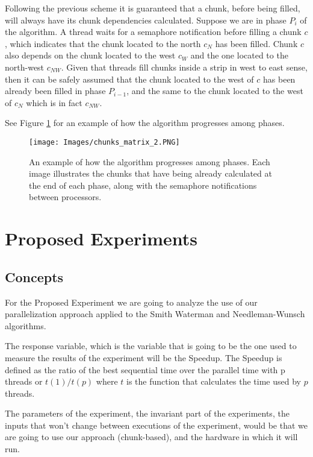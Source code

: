 \documentclass[journal]{IEEEtran}
\begin{document}
Following the previous scheme it is guaranteed that a chunk, before being filled, will always have its chunk dependencies calculated. Suppose we are in phase $P_i$ of the algorithm. A thread waits for a semaphore notification before filling a chunk $c$, which indicates that the chunk located to the north $c_N$ has been filled. Chunk $c$ also depends on the chunk located to the west $c_W$ and the one located to the north-west $c_{NW}$. Given that threads fill chunks inside a strip in west to east sense, then it can be safely assumed that the chunk located to the west of $c$ has been already been filled in phase $P_{i-1}$, and the same to the chunk located to the west of $c_{N}$ which is in fact $c_{NW}$. 

See Figure \ref{exec_2} for an example of how the algorithm progresses among phases.

\begin{figure}[h]
  \begin{center}
    \texttt{[image: Images/chunks\_matrix\_2.PNG]}
  \end{center}
  \caption{An example of how the algorithm progresses among phases. Each image illustrates the chunks that have being already calculated at the end of each phase, along with the semaphore notifications between processors.}
  \label{exec_2}
\end{figure}

\section{Proposed Experiments}


\subsection{Concepts}

For the Proposed Experiment we are going to analyze the use of our parallelization approach applied to the Smith Waterman and Needleman-Wunsch algorithms.

The response variable, which is the variable that is going to be the one used to measure the results of the experiment will be the Speedup. The Speedup is defined as the ratio of the best sequential time over the parallel time with p threads or $t(1)/t(p)$ where $t$ is the function that calculates the time used by $p$ threads.

The parameters of the experiment, the invariant part of the experiments, the inputs that won't change between executions of the experiment, would be that we are going to use our approach (chunk-based), and the hardware in which it will run.
\end{document}
